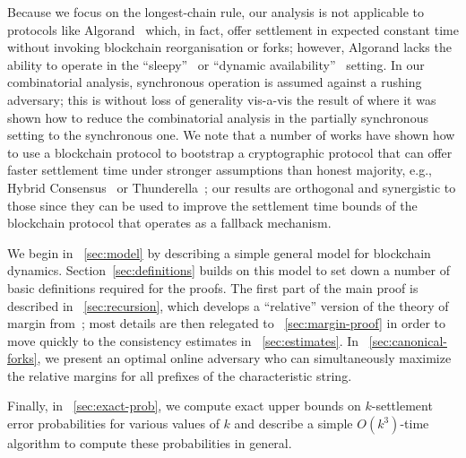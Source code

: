 Because we focus on the longest-chain rule, our
analysis is not applicable to protocols like
Algorand~\cite{DBLP:journals/corr/Micali16} which, in fact, offer
settlement in expected constant time without invoking blockchain
reorganisation or forks; however, Algorand lacks the ability to
operate in the ``sleepy''~\cite{DBLP:conf/asiacrypt/PassS17} or
``dynamic availability''~\cite{DBLP:journals/iacr/BadertscherGKRZ18}
setting.
In our combinatorial analysis, synchronous operation is assumed
against a rushing adversary; this is without loss of generality
vis-a-vis the result of \cite{DBLP:conf/eurocrypt/DavidGKR18} where it
was shown how to reduce the combinatorial analysis in the partially
synchronous setting to the synchronous one.  We note that a number of
works have shown how to use a blockchain protocol to bootstrap a
cryptographic protocol that can offer faster settlement time under
stronger assumptions than honest majority, e.g., Hybrid
Consensus~\cite{DBLP:conf/wdag/PassS17} or
Thunderella~\cite{DBLP:conf/eurocrypt/PassS18}; our results are
orthogonal and synergistic to those since they can be used to improve
the settlement time bounds of the blockchain protocol that operates as
a fallback mechanism.

 We begin in \Section~\ref{sec:model} by describing
a simple general model for blockchain
dynamics. Section~\ref{sec:definitions} builds on this model to set
down a number of basic definitions required for the proofs. The first
part of the main proof is described in \Section~\ref{sec:recursion},
which develops a ``relative'' version of the theory of margin
from~\cite{KRDO17}; most details are then relegated to
\Section~\ref{sec:margin-proof} in order to move quickly to the
consistency estimates in \Section~\ref{sec:estimates}.  In
\Section~\ref{sec:canonical-forks}, we present an optimal online
adversary who can simultaneously maximize the relative margins for all
prefixes of the characteristic string.   Finally, in \Section~\ref{sec:exact-prob}, we
compute exact upper bounds on $k$-settlement error probabilities for
various values of $k$ and describe a simple $O(k^3)$-time algorithm to
compute these probabilities in general.
 

